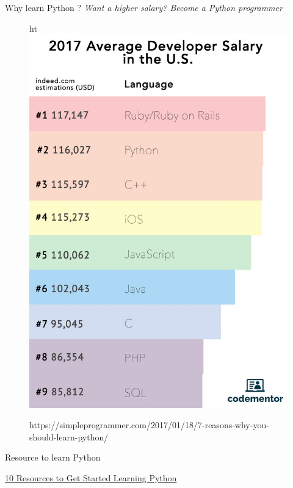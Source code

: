 \documentclass{bredelebeamer}
\begin{document}
\begin{frame}{Why learn Python ?}
\emph{Want a higher salary? Become a Python programmer}
\begin{figure}{ht}
\includegraphics[scale=0.30]{../image/averagesalar.jpg}
		\label{fig:result1}
		\caption{https://simpleprogrammer.com/2017/01/18/7-reasons-why-you-should-learn-python/}
\end{figure}

\end{frame}	
  

\begin{frame}{Resource to learn Python}

{\LARGE
\href{https://simpleprogrammer.com/2017/02/15/get-started-learning-python/}{10 Resources to Get Started Learning Python}
}

\end{frame}
\end{document}
